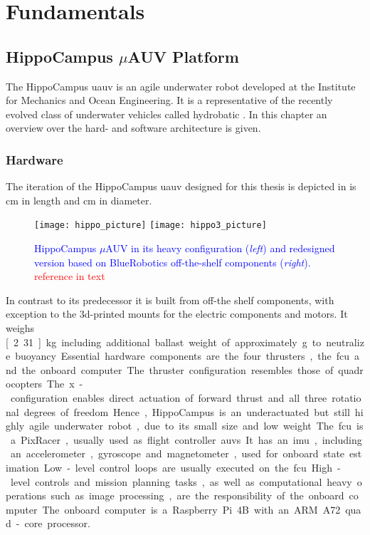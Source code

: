 \chapter{Fundamentals}

\section{HippoCampus $\mu$AUV Platform}

The HippoCampus \ac{uauv} is an agile underwater robot developed at the Institute for Mechanics and Ocean Engineering. It is a representative of the recently evolved class of underwater vehicles called hydrobatic \cite{hydrobatic}. In this chapter an overview over the hard- and software architecture is given.

\subsection{Hardware}
The iteration of the HippoCampus \ac{uauv} designed for this thesis is depicted in  is \unit[30]{cm} in length and \unit[8]{cm} in diameter.
\begin{figure}[h!]
    \centering
    \texttt{[image: hippo\_picture]}
    \quad\quad
    \texttt{[image: hippo3\_picture]}
    \caption{\textcolor{blue}{HippoCampus $\mu$AUV in its heavy configuration (\textit{left}) and redesigned version based on BlueRobotics off-the-shelf components (\textit{right}).} \textcolor{red}{reference in text}}
    \label{fig:new-vehicle-design}
\end{figure}
In contrast to its predecessor it is built from off-the shelf components, with exception to the 3d-printed mounts for the electric components and motors. It weighs \unit[2.31]{kg} including additional ballast weight of approximately \unit[150]{g} to neutralize buoyancy.

Essential hardware components are the four thrusters, the \ac{fcu} and the onboard computer. The thruster configuration resembles those of quadrocopters. The x-configuration enables direct actuation of forward thrust and all three rotational degrees of freedom. Hence, HippoCampus is an underactuated but still highly agile underwater robot, due to its small size and low weight.

The \ac{fcu} is a PixRacer, usually used as flight controller \acp{auv}. It has an \ac{imu}, including an accelerometer, gyroscope and magnetometer, used for onboard state estimation. Low-level control loops are usually executed on the \ac{fcu}. High-level controls and mission planning tasks, as well as computational heavy operations such as image processing, are the responsibility of the onboard computer. The onboard computer is a Raspberry Pi 4B with an ARM A72 quad-core processor.

